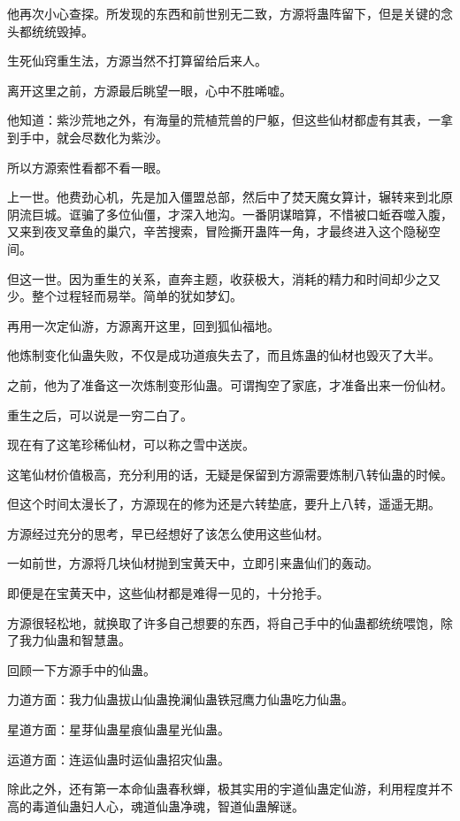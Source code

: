 \begin{this_body}
他再次小心查探。所发现的东西和前世别无二致，方源将蛊阵留下，但是关键的念头都统统毁掉。

生死仙窍重生法，方源当然不打算留给后来人。

离开这里之前，方源最后眺望一眼，心中不胜唏嘘。

他知道：紫沙荒地之外，有海量的荒植荒兽的尸躯，但这些仙材都虚有其表，一拿到手中，就会尽数化为紫沙。

所以方源索性看都不看一眼。

上一世。他费劲心机，先是加入僵盟总部，然后中了焚天魔女算计，辗转来到北原阴流巨城。诓骗了多位仙僵，才深入地沟。一番阴谋暗算，不惜被口蚯吞噬入腹，又来到夜叉章鱼的巢穴，辛苦搜索，冒险撕开蛊阵一角，才最终进入这个隐秘空间。

但这一世。因为重生的关系，直奔主题，收获极大，消耗的精力和时间却少之又少。整个过程轻而易举。简单的犹如梦幻。

再用一次定仙游，方源离开这里，回到狐仙福地。

他炼制变化仙蛊失败，不仅是成功道痕失去了，而且炼蛊的仙材也毁灭了大半。

之前，他为了准备这一次炼制变形仙蛊。可谓掏空了家底，才准备出来一份仙材。

重生之后，可以说是一穷二白了。

现在有了这笔珍稀仙材，可以称之雪中送炭。

这笔仙材价值极高，充分利用的话，无疑是保留到方源需要炼制八转仙蛊的时候。

但这个时间太漫长了，方源现在的修为还是六转垫底，要升上八转，遥遥无期。

方源经过充分的思考，早已经想好了该怎么使用这些仙材。

一如前世，方源将几块仙材抛到宝黄天中，立即引来蛊仙们的轰动。

即便是在宝黄天中，这些仙材都是难得一见的，十分抢手。

方源很轻松地，就换取了许多自己想要的东西，将自己手中的仙蛊都统统喂饱，除了我力仙蛊和智慧蛊。

回顾一下方源手中的仙蛊。

力道方面：我力仙蛊拔山仙蛊挽澜仙蛊铁冠鹰力仙蛊吃力仙蛊。

星道方面：星芽仙蛊星痕仙蛊星光仙蛊。

运道方面：连运仙蛊时运仙蛊招灾仙蛊。

除此之外，还有第一本命仙蛊春秋蝉，极其实用的宇道仙蛊定仙游，利用程度并不高的毒道仙蛊妇人心，魂道仙蛊净魂，智道仙蛊解谜。


\end{this_body}
